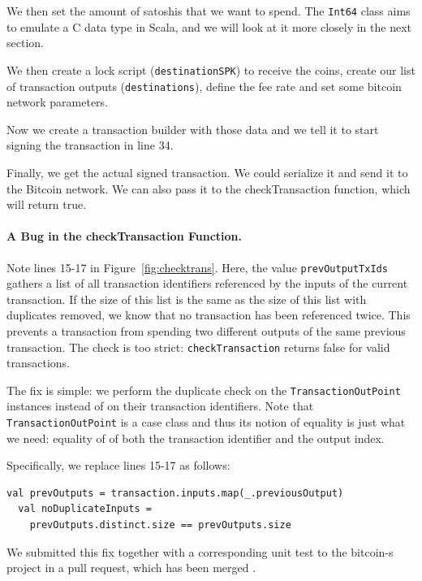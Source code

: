 \documentclass[hyphens, a4paper,USenglish,cleveref, autoref, thm-restate]{oasics-v2019}
\begin{document}
We then set the amount of satoshis that we want to spend. The \texttt{Int64}
class aims to emulate a C data type in Scala, and we will look at it
more closely in the next section.

We then create a lock script (\texttt{destinationSPK}) to receive the
coins, create our list of transaction outputs (\texttt{destinations}),
define the fee rate and set some bitcoin network parameters.

Now we create a transaction builder with those data and we tell it to
start signing the transaction in line 34.

Finally, we get the actual signed transaction. We could serialize it
and send it to the Bitcoin network. We can also pass it to the
checkTransaction function, which will return true.

\paragraph{A Bug in the checkTransaction Function.} Note lines 15-17
in Figure~\ref{fig:checktrans}. Here, the value
\texttt{prevOutputTxIds} gathers a list of all transaction identifiers
referenced by the inputs of the current transaction. If the size of
this list is the same as the size of this list with duplicates
removed, we know that no transaction has been referenced twice. This
prevents a transaction from spending two different outputs of the same
previous transaction. The check is too strict:
\texttt{checkTransaction} returns false for valid transactions.

The fix is simple: we perform the duplicate check on the
\texttt{TransactionOutPoint} instances instead of on their transaction
identifiers. Note that \texttt{TransactionOutPoint} is a case class
and thus its notion of equality is just what we need: equality of of
both the transaction identifier and the output index.

Specifically, we replace lines 15-17 as follows:
\begin{lstlisting}[style=scala, firstnumber=15]
  val prevOutputs = transaction.inputs.map(_.previousOutput)
  val noDuplicateInputs = 
    prevOutputs.distinct.size == prevOutputs.size
\end{lstlisting}


We submitted this fix together with a corresponding unit test to the
bitcoin-s project in a pull request, which has been merged
\cite{BitcoinS:pull435}.
\end{document}
